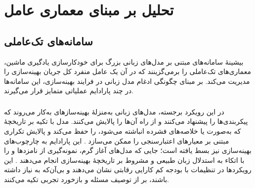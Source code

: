 
\section{تحلیل بر مبنای معماری عامل}
\subsection{سامانه‌های تک‌عاملی}

بیشینهٔ سامانه‌های مبتنی بر مدل‌های زبانی بزرگ برای خودکارسازی یادگیری ماشین، معماری‌های تک‌عاملی را برمی‌گزینند که در آن یک عامل منفرد کل جریان بهینه‌سازی را مدیریت می‌کند. بر مبنای چگونگی ادغام مدل زبانی در فرایند بهینه‌سازی، این سامانه‌ها در چند پارادایم عملیاتی متمایز قرار می‌گیرند.

\subsubsection{\protect{}}
در این رویکرد برجسته، مدل‌های زبانی به‌منزلهٔ بهینه‌سازهای  به‌کار می‌روند که پیکربندی‌ها را پیشنهاد می‌کنند و از راه  آن‌ها را پالایش می‌کنند. مدل با تکیه بر تاریخچهٔ  که به‌صورت  یا خلاصه‌های فشرده انباشته می‌شود،  را حفظ می‌کند و پالایش تکراری مبتنی بر معیارهای اعتبارسنجی را ممکن می‌سازد \cite{zhang2023usingLLMforHPO, zheng2023GENIUS}. این پارادایم به چارچوب‌های بهینه‌سازی  نیز بسط یافته است؛ جایی که مدل‌های آغاز گرم، نمونه‌گیری از نامزدها و  را با اتکاء به استدلال زبان طبیعی و مشروط بر تاریخچهٔ بهینه‌سازی انجام می‌دهند \cite{liu2024LLAMBO}. این رویکردها در تنظیمات با بودجه کم کارایی رقابتی نشان می‌دهند و بی‌آن‌که به  نیاز داشته باشند، بر  از توصیف مسئله و بازخورد تجربی تکیه می‌کنند.


